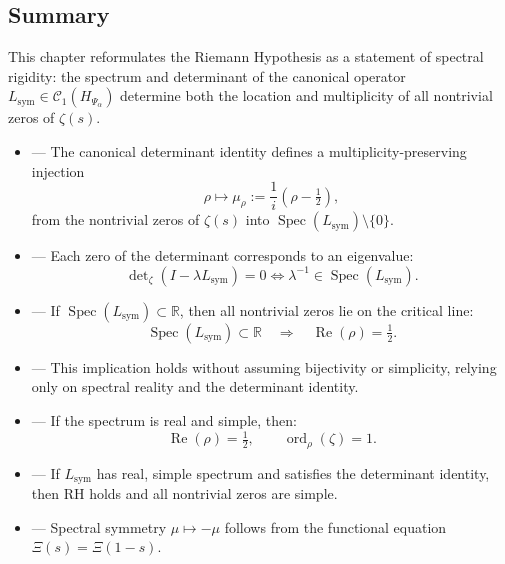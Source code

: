 \subsection*{Summary}

This chapter reformulates the Riemann Hypothesis as a statement of spectral rigidity: the spectrum and determinant of the canonical operator \( L_{\mathrm{sym}} \in \mathcal{C}_1(H_{\Psi_\alpha}) \) determine both the location and multiplicity of all nontrivial zeros of \( \zeta(s) \).

\begin{itemize}
  \item {} — The canonical determinant identity defines a multiplicity-preserving injection
  \[
  \rho \mapsto \mu_\rho := \frac{1}{i}(\rho - \tfrac{1}{2}),
  \]
  from the nontrivial zeros of \( \zeta(s) \) into \( \operatorname{Spec}(L_{\mathrm{sym}}) \setminus \{0\} \).

  \item {} — Each zero of the determinant corresponds to an eigenvalue:
  \[
  \det\nolimits_\zeta(I - \lambda L_{\mathrm{sym}}) = 0 \iff \lambda^{-1} \in \operatorname{Spec}(L_{\mathrm{sym}}).
  \]

  \item {} — If \( \operatorname{Spec}(L_{\mathrm{sym}}) \subset \mathbb{R} \), then all nontrivial zeros lie on the critical line:
  \[
  \operatorname{Spec}(L_{\mathrm{sym}}) \subset \mathbb{R} \quad \Rightarrow \quad \operatorname{Re}(\rho) = \tfrac{1}{2}.
  \]

  \item {} — This implication holds without assuming bijectivity or simplicity, relying only on spectral reality and the determinant identity.

  \item {} — If the spectrum is real and simple, then:
  \[
  \operatorname{Re}(\rho) = \tfrac{1}{2}, \qquad \operatorname{ord}_\rho(\zeta) = 1.
  \]

  \item {} — If \( L_{\mathrm{sym}} \) has real, simple spectrum and satisfies the determinant identity, then RH holds and all nontrivial zeros are simple.

  \item {} — Spectral symmetry \( \mu \mapsto -\mu \) follows from the functional equation \( \Xi(s) = \Xi(1 - s) \).


\end{itemize}
